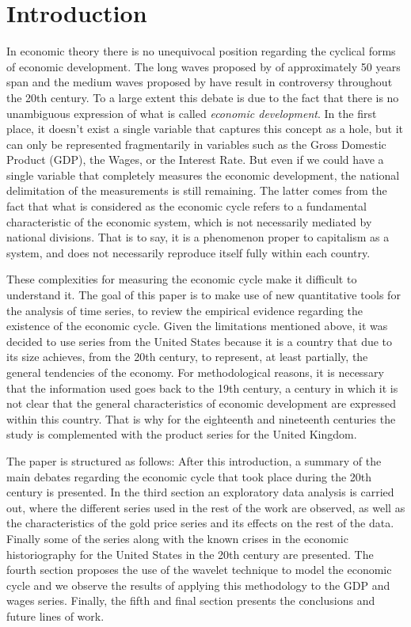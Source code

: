 \documentclass[a4paper]{article}
\begin{document}
\section{Introduction}
 
In economic theory there is no unequivocal position regarding the cyclical forms of economic development. The long waves proposed by \cite{kondratieff1979long} of approximately 50 years span and the medium waves proposed by \cite{kuznets1930secular} have result in controversy throughout the 20th century. To a large extent this debate is due to the fact that there is no unambiguous expression of what is called \textit{economic development}. In the first place, it doesn't exist a single variable that captures this concept as a hole, but it can only be represented fragmentarily in variables such as the Gross Domestic Product (GDP), the Wages, or the Interest Rate. But even if we could have a single variable that completely measures the economic development, the national delimitation of the measurements is still remaining. The latter comes from the fact that what is considered as the economic cycle refers to a fundamental characteristic of the economic system, which is not necessarily mediated by national divisions. That is to say, it is a phenomenon proper to capitalism as a system, and does not necessarily reproduce itself fully within each country.


These complexities for measuring the economic cycle make it difficult to understand it. The goal of this paper is to make use of new quantitative tools for the analysis of time series, to review the empirical evidence regarding the existence of the economic cycle. Given the limitations mentioned above, it was decided to use series from the United States because it is a country that due to its size achieves, from the 20th century, to represent, at least partially, the general tendencies of the economy. For methodological reasons, it is necessary that the information used goes back to the 19th century, a century in which it is not clear that the general characteristics of economic development are expressed within this country. That is why for the eighteenth and nineteenth centuries the study is complemented with the product series for the United Kingdom.

The paper is structured as follows: After this introduction, a summary of the main debates regarding the economic cycle that took place during the 20th century is presented. In the third section an exploratory data analysis is carried out, where the different series used in the rest of the work are observed, as well as the characteristics of the gold price series and its effects on the rest of the data. Finally some of the series along with the known crises in the economic historiography for the United States in the 20th century are presented. The fourth section proposes the use of the wavelet technique to model the economic cycle and we observe the results of applying this methodology to the GDP and wages series. Finally, the fifth and final section presents the conclusions and future lines of work.
\end{document}

